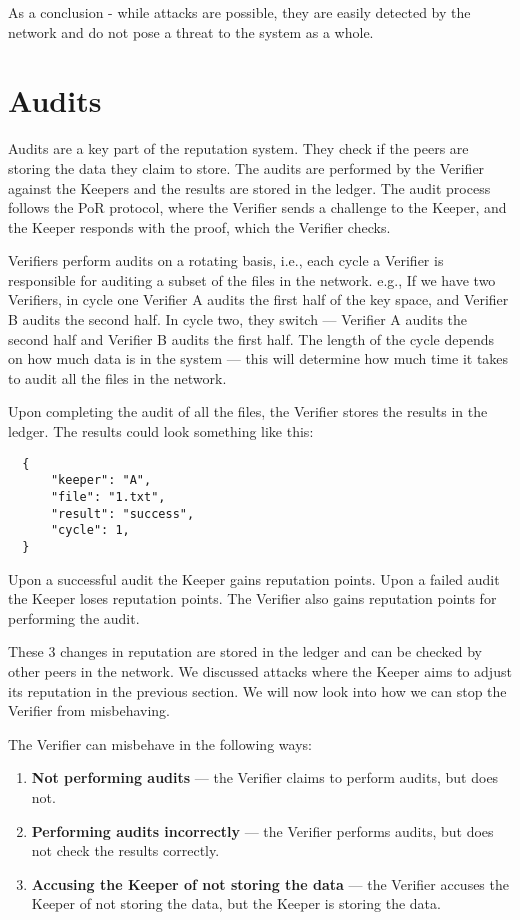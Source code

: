 As a conclusion - while attacks are possible, they are easily detected by the network
and do not pose a threat to the system as a whole.

\section{Audits}

Audits are a key part of the reputation system.
They check if the peers are storing the data they claim to store.
The audits are performed by the Verifier against the Keepers and the results are stored in the ledger.
The audit process follows the PoR protocol, where the Verifier sends a challenge to the Keeper,
and the Keeper responds with the proof, which the Verifier checks.

Verifiers perform audits on a rotating basis, i.e., each cycle a Verifier is responsible for auditing
a subset of the files in the network.
e.g., If we have two Verifiers, in cycle one Verifier A audits the first half of the key space,
and Verifier B audits the second half.
In cycle two, they switch --- Verifier A audits the second half and Verifier B audits the first half.
The length of the cycle depends on how much data is in the system --- this will determine
how much time it takes to audit all the files in the network.

Upon completing the audit of all the files, the Verifier stores the results in the ledger.
The results could look something like this:
\begin{verbatim}
  {
      "keeper": "A",
      "file": "1.txt",
      "result": "success",
      "cycle": 1,
  }
\end{verbatim}

Upon a successful audit the Keeper gains reputation points.
Upon a failed audit the Keeper loses reputation points.
The Verifier also gains reputation points for performing the audit.

These 3 changes in reputation are stored in the ledger and can be checked by other peers in the network.
We discussed attacks where the Keeper aims to adjust its reputation in the previous section.
We will now look into how we can stop the Verifier from misbehaving.

The Verifier can misbehave in the following ways:
\begin{enumerate}
    \item \textbf{Not performing audits} --- the Verifier claims to perform audits, but does not.
    \item \textbf{Performing audits incorrectly} --- the Verifier performs audits, but does not check the results correctly.
    \item \textbf{Accusing the Keeper of not storing the data} --- the Verifier accuses the Keeper of not storing the data, but the Keeper is storing the data.
\end{enumerate}

